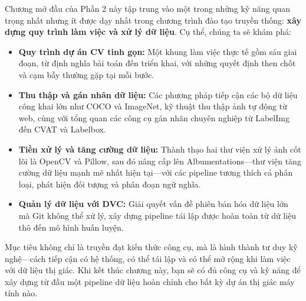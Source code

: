Chương mở đầu của Phần 2 này tập trung vào một trong những kỹ năng quan trọng nhất nhưng ít được dạy nhất trong chương trình đào tạo truyền thống: \textbf{xây dựng quy trình làm việc và xử lý dữ liệu}. Cụ thể, chúng ta sẽ khám phá:

\begin{itemize}
    \item \textbf{Quy trình dự án CV tinh gọn:} Một khung làm việc thực tế gồm sáu giai đoạn, từ định nghĩa bài toán đến triển khai, với những quyết định then chốt và cạm bẫy thường gặp tại mỗi bước.

    \item \textbf{Thu thập và gán nhãn dữ liệu:} Các phương pháp tiếp cận các bộ dữ liệu công khai lớn như COCO và ImageNet, kỹ thuật thu thập ảnh tự động từ web, cùng với tổng quan các công cụ gán nhãn chuyên nghiệp từ LabelImg đến CVAT và Labelbox.

    \item \textbf{Tiền xử lý và tăng cường dữ liệu:} Thành thạo hai thư viện xử lý ảnh cốt lõi là OpenCV và Pillow, sau đó nâng cấp lên Albumentations---thư viện tăng cường dữ liệu mạnh mẽ nhất hiện tại---với các pipeline tương thích cả phân loại, phát hiện đối tượng và phân đoạn ngữ nghĩa.

    \item \textbf{Quản lý dữ liệu với DVC:} Giải quyết vấn đề phiên bản hóa dữ liệu lớn mà Git không thể xử lý, xây dựng pipeline tái lập được hoàn toàn từ dữ liệu thô đến mô hình huấn luyện.
\end{itemize}

Mục tiêu không chỉ là truyền đạt kiến thức công cụ, mà là hình thành tư duy kỹ nghệ---cách tiếp cận có hệ thống, có thể tái lập và có thể mở rộng khi làm việc với dữ liệu thị giác. Khi kết thúc chương này, bạn sẽ có đủ công cụ và kỹ năng để xây dựng từ đầu một pipeline dữ liệu hoàn chỉnh cho bất kỳ dự án thị giác máy tính nào.
